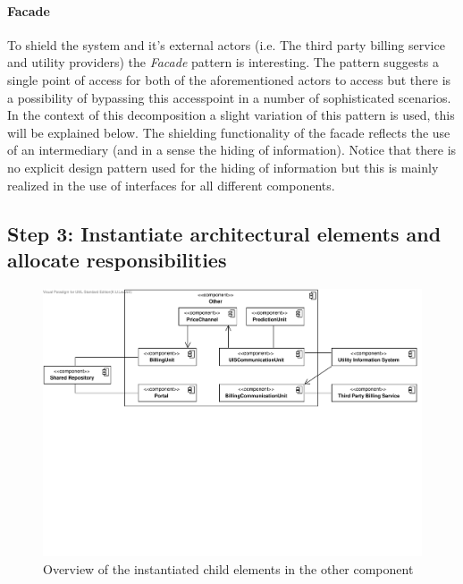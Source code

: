 \paragraph{Facade}

\npar To shield the system and it's external actors (i.e. The third party
billing service and utility providers) the \emph{Facade} pattern is interesting.
The pattern suggests a single point of access for both of the aforementioned
actors to access but there is a possibility of bypassing this accesspoint in a
number of sophisticated scenarios. In the context of this decomposition a slight
variation of this pattern is used, this will be explained below. The shielding
functionality of the facade reflects the use of an intermediary (and in a sense
the hiding of information). Notice that there is no explicit design pattern used
for the hiding of information but this is mainly realized in the use of
interfaces for all different components.

\subsection{Step 3: Instantiate architectural elements and allocate responsibilities}
\label{add:it10/elements}

\begin{figure}[H]
	\begin{centering}
		\includegraphics[width=\textwidth]{figs/add-it10-elements.pdf}
		\caption{Overview of the instantiated child elements in the other component}
		\label{fig:add/it10/decomposition}
	\end{centering}
\end{figure}

